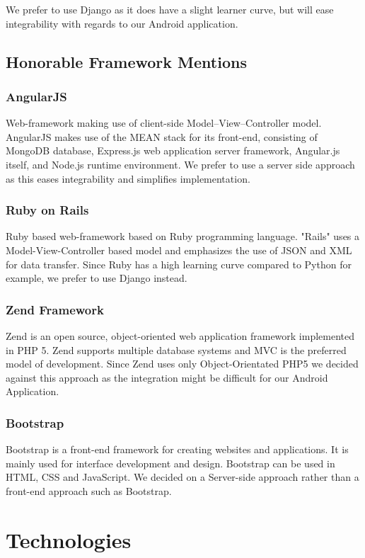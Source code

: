 \documentclass{article}
\begin{document}
	We prefer to use Django as it does have a slight learner curve, but will ease integrability with regards to our Android application.
	
	
	\subsection{Honorable Framework Mentions}
	\subsubsection{AngularJS}\label{subsubsec: AngularJS}
		Web-framework making use of client-side Model–View–Controller model. 
		AngularJS makes use of the MEAN stack for its front-end, consisting of MongoDB database, Express.js web application server framework, Angular.js itself, and Node.js runtime environment.
		We prefer to use a server side approach as this eases integrability and simplifies implementation.
	\subsubsection{Ruby on Rails}\label{subsubsec: Rails}
		Ruby based web-framework based on Ruby programming language. "Rails" uses a Model-View-Controller based model and emphasizes the use of JSON and XML for data transfer.
		Since Ruby has a high learning curve compared to Python for example, we prefer to use Django instead.
	\subsubsection{Zend Framework}\label{subsubsec: Zend}
	 Zend is an open source, object-oriented web application framework implemented in PHP 5. Zend supports multiple database systems and MVC is the preferred model of development.
	 Since Zend uses only Object-Orientated PHP5 we decided against this approach as the integration might be difficult for our Android Application.
	 \subsubsection{Bootstrap}\label{subsubsec: Bootstrap}
	 Bootstrap is a front-end framework for creating websites and applications. It is mainly used for interface development and design. Bootstrap can be used in HTML, CSS and JavaScript. 
	 We decided on a Server-side approach rather than a front-end approach such as Bootstrap.
	

\section{Technologies}
\end{document}
